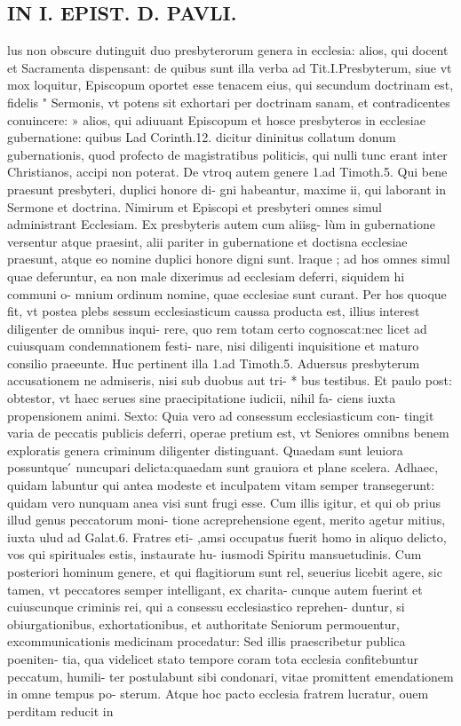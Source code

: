 \documentclass{article}
\begin{document}
\begin{pages}
\section*{IN I. EPIST. D. PAVLI. }
\marginpar{[ p.67 ]}
\marginpar{[ p.68 ]}
\marginpar{[ p.69 ]}
\marginpar{[ p.70 ]}\pstart lus non obscure dutinguit duo presbyterorum genera in ecclesia: alios, qui docent et Sacramenta dispensant: de quibus sunt illa verba ad Tit.I.Presbyterum, siue vt mox loquitur, Episcopum oportet esse tenacem eius, qui secundum doctrinam est, fidelis " Sermonis, vt potens sit exhortari per doctrinam sanam, et contradicentes conuincere: » alios, qui adiuuant Episcopum et hosce presbyteros in ecclesiae gubernatione: quibus Lad Corinth.12. dicitur dininitus collatum donum gubernationis, quod profecto de magistratibus politicis, qui nulli tunc erant inter Christianos, accipi non poterat. De vtroq autem genere 1.ad Timoth.5. Qui bene praesunt presbyteri, duplici honore di- gni habeantur, maxime ii, qui laborant in Sermone et doctrina. Nimirum et Episcopi et presbyteri omnes simul administrant Ecclesiam. Ex presbyteris autem cum aliisg- lùm in gubernatione versentur atque  praesint, alii pariter in gubernatione et doctisna ecclesiae praesunt, atque  eo nomine duplici honore digni sunt. lraque ; ad hos omnes simul quae deferuntur, ea non male dixerimus ad ecclesiam deferri, siquidem hi communi o- mnium ordinum nomine, quae ecclesiae sunt curant. Per hos quoque  fit, vt postea plebs sessum ecclesiasticum caussa producta est, illius interest diligenter de omnibus inqui- rere, quo rem totam certo cognoscat:nec licet ad cuiusquam condemnationem festi- nare, nisi diligenti inquisitione et maturo consilio praeeunte. Huc pertinent illa 1.ad   Timoth.5. Aduersus presbyterum accusationem ne admiseris, nisi sub duobus aut tri- * bus testibus. Et paulo post: obtestor, vt haec serues sine praecipitatione iudicii, nihil fa- ciens iuxta propensionem animi. Sexto: Quia vero ad consessum ecclesiasticum con- tingit varia de peccatis publicis deferri, operae pretium est, vt Seniores omnibns benem exploratis genera criminum diligenter distinguant. Quaedam sunt leuiora possuntque ́ nuncupari delicta:quaedam sunt grauiora et plane scelera. Adhaec, quidam labuntur qui antea modeste et inculpatem vitam semper transegerunt: quidam vero nunquam anea visi sunt frugi esse. Cum illis igitur, et qui ob prius illud genus peccatorum moni-   tione acreprehensione egent, merito agetur mitius, iuxta ulud ad Galat.6. Fratres eti-  ,amsi occupatus fuerit homo in aliquo delicto, vos qui spirituales estis, instaurate hu- iusmodi Spiritu mansuetudinis. Cum posteriori hominum genere, et qui flagitiorum sunt rel, seuerius licebit agere, sic tamen, vt peccatores semper intelligant, ex charita- cunque  autem fuerint et cuiuscunque  criminis rei, qui a consessu ecclesiastico reprehen- duntur, si obiurgationibus, exhortationibus, et authoritate Seniorum permouentur, excommunicationis medicinam procedatur: Sed illis praescribetur publica poeniten- tia, qua videlicet stato tempore coram tota ecclesia confitebuntur peccatum, humili- ter postulabunt sibi condonari, vitae promittent emendationem in omne tempus po- sterum. Atque  hoc pacto ecclesia fratrem lucratur, ouem perditam reducit in 
\end{pages}
\end{document}
